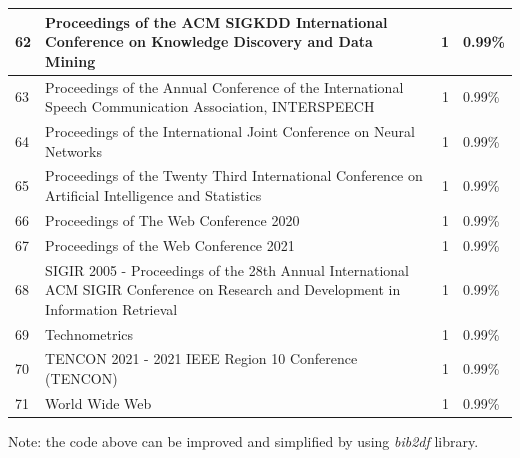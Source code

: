 \documentclass[
]{article}
\newenvironment{Shaded}{\begin{snugshade}}{\end{snugshade}}
\newcommand{\AttributeTok}[1]{\textcolor[rgb]{0.77,0.63,0.00}{#1}}
\newcommand{\FunctionTok}[1]{\textcolor[rgb]{0.00,0.00,0.00}{#1}}
\newcommand{\NormalTok}[1]{#1}
\newcommand{\OtherTok}[1]{\textcolor[rgb]{0.56,0.35,0.01}{#1}}
\newcommand{\SpecialCharTok}[1]{\textcolor[rgb]{0.00,0.00,0.00}{#1}}
\newcommand{\StringTok}[1]{\textcolor[rgb]{0.31,0.60,0.02}{#1}}
\begin{document}
\begin{table}
\begin{tabular}[t]{l|l|r|l}
\hline
62 & Proceedings of the ACM SIGKDD International Conference on Knowledge Discovery and Data Mining & 1 & 0.99\%\\
\hline
63 & Proceedings of the Annual Conference of the International Speech Communication Association, INTERSPEECH & 1 & 0.99\%\\
\hline
64 & Proceedings of the International Joint Conference on Neural Networks & 1 & 0.99\%\\
\hline
65 & Proceedings of the Twenty Third International Conference on Artificial Intelligence and Statistics & 1 & 0.99\%\\
\hline
66 & Proceedings of The Web Conference 2020 & 1 & 0.99\%\\
\hline
67 & Proceedings of the Web Conference 2021 & 1 & 0.99\%\\
\hline
68 & SIGIR 2005 - Proceedings of the 28th Annual International ACM SIGIR Conference on Research and Development in Information Retrieval & 1 & 0.99\%\\
\hline
69 & Technometrics & 1 & 0.99\%\\
\hline
70 & TENCON 2021 - 2021 IEEE Region 10 Conference (TENCON) & 1 & 0.99\%\\
\hline
71 & World Wide Web & 1 & 0.99\%\\
\hline
\end{tabular}
\end{table}

Note: the code above can be improved and simplified by using \emph{bib2df} library.

\begin{Shaded}
\end{Shaded}
\end{document}
